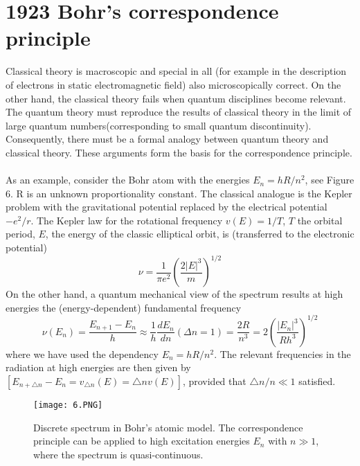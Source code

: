 \section{1923 Bohr's correspondence principle}
Classical theory is macroscopic and special in all (for example in the description of electrons in static electromagnetic field) also microscopically correct. On the other hand, the classical theory fails when quantum disciplines become relevant. The quantum theory must reproduce the results of classical theory in the limit of large quantum numbers(corresponding to small quantum discontinuity). Consequently, there must be a formal analogy between quantum theory and classical theory. These arguments form the basis for the correspondence principle. \\\\
As an example, consider the Bohr atom with the energies $E_n=hR/n^2$, see Figure  6. R is an unknown proportionality constant. The classical analogue is the Kepler problem with the gravitational potential
replaced by the electrical potential $-e^2/r$. The Kepler law for the rotational frequency $v(E) = 1/T$, $T$ the orbital period, $E$, the energy of the
classic elliptical orbit, is (transferred to the electronic potential)
\begin{equation}
\nu=\frac{1}{\pi e^{2}}\left(\frac{2|E|^{3}}{m}\right)^{1 / 2}
\end{equation}
On the other hand, a quantum mechanical view of the spectrum results at high energies the (energy-dependent) fundamental frequency
\begin{equation}
\nu\left(E_{n}\right)=\frac{E_{n+1}-E_{n}}{h} \approx \frac{1}{h} \frac{d E_{n}}{d n}(\Delta n=1)=\frac{2 R}{n^{3}}=2\left(\frac{\left|E_{n}\right|^{3}}{R h^{3}}\right)^{1 / 2}
\end{equation}
where we have used the dependency $E_n = hR/n^2$. The relevant frequencies in the radiation at high energies are then given by $[E_{n+\triangle n}-E_n=v_{\triangle n}(E)=\triangle n v(E)]$, provided that $\triangle n/n \ll 1$ satisfied.
\begin{figure}[ht]
    \begin{minipage}{0.5\textwidth}
        \centering
        \texttt{[image: 6.PNG]}
    \end{minipage}
    \begin{minipage}{0.5\textwidth}
        \caption{Discrete spectrum in Bohr's atomic model. The correspondence principle can be applied to high excitation energies $E_n$ with $n\gg 1$, where the spectrum is quasi-continuous.}
    \end{minipage}
    \label{fig:6}
\end{figure}
